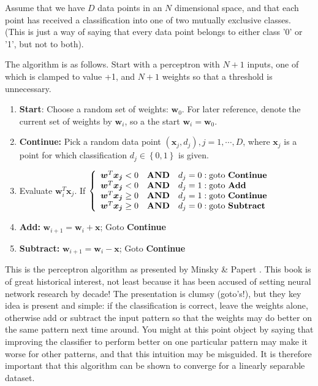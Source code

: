 Assume that we have $D$ data points in an $N$ dimensional space,
and that each point has received a classification into one of two mutually exclusive classes. (This is just a way of saying
that every data point belongs to either class '0' or '1', but not to both). 

The algorithm is as follows. Start with a perceptron with $N+1$ inputs, one of which is clamped to value +1,  and $N+1$ weights so that a threshold is unnecessary.
\begin{enumerate}
\item {\bf Start}: Choose a random set of  weights: $\boldsymbol{w}_0$. For later reference, denote the current set of weights by $\boldsymbol{w}_i$, so a the start
  $\boldsymbol{w}_i = \boldsymbol{w}_0$.
  
\item {\bf Continue: } Pick a random data point $(\boldsymbol{x}_j, d_j), j = 1, \cdots, D$, where $\boldsymbol{x}_j$ is a point for which
  classification $d_j \in \left\{ 0, 1 \right\}$  is given.

\item Evaluate $\boldsymbol{w}^T_i \boldsymbol{x}_j$.  If $\left\{ \begin{array}{lcl} \boldsymbol{w}^T \boldsymbol{x_j} <0 & \mbox{\bf AND}& d_j = 0: \mbox{goto {\bf Continue}}\\
  \boldsymbol{w}^T \boldsymbol{x_j} <0 & \mbox{\bf AND}& d_j = 1: \mbox{goto {\bf Add}}  \\
  \boldsymbol{w}^T \boldsymbol{x_j} \ge 0 & \mbox{\bf AND}& d_j = 1: \mbox{goto {\bf Continue}} \\
  \boldsymbol{w}^T \boldsymbol{x_j} \ge 0 & \mbox{\bf AND}& d_j = 0: \mbox{goto {\bf Subtract}} \end{array} \right.$

\item {\bf Add: } $\boldsymbol{w}_{i+1} = \boldsymbol{w}_i + \boldsymbol{x}$; Goto {\bf Continue}

\item {\bf Subtract:}    $\boldsymbol{w}_{i+1} = \boldsymbol{w}_i - \boldsymbol{x}$; Goto {\bf Continue}
\end{enumerate}

This is the perceptron algorithm as presented by Minsky \& Papert \cite{minsky}. This book is of great historical interest, not least because it has been
accused of setting neural network research by decade! The presentation is clumsy (goto's!), but they key idea is present and simple: if the classification
is correct, leave the weights alone, otherwise add or subtract the input pattern so that the weights may do better on the same pattern next time around.
You might at this point object by saying that improving the classifier to perform better on one particular pattern may make it worse for other patterns, and that
this intuition may be misguided. It is therefore important that this algorithm can be shown to converge for a linearly separable dataset.


